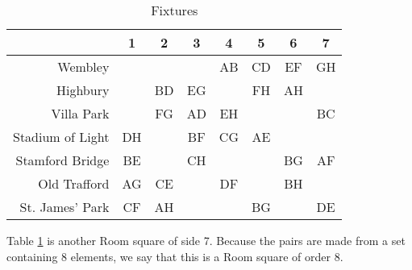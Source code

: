 \begin{table}[h!]
  \begin{center}
    \begin{tabular}{r|ccccccc}
                       & 1  &  2 &  3 &  4 &  5 &  6 &  7 \\ \hline
               Wembley &    &    &    & AB & CD & EF & GH \\
              Highbury &    & BD & EG &    & FH & AH &    \\
            Villa Park &    & FG & AD & EH &    &    & BC \\
      Stadium of Light & DH &    & BF & CG & AE &    &    \\
       Stamford Bridge & BE &    & CH &    &    & BG & AF \\
          Old Trafford & AG & CE &    & DF &    & BH &    \\
       St. James' Park & CF & AH &    &    & BG &    & DE
    \end{tabular}
  \end{center}
  \caption{Fixtures}
  \label{tab:fixtures}
\end{table}

Table \ref{tab:fixtures} is another Room square of side 7.
Because the pairs are made from a set containing 8 elements, we say that this is a Room square of order 8.
